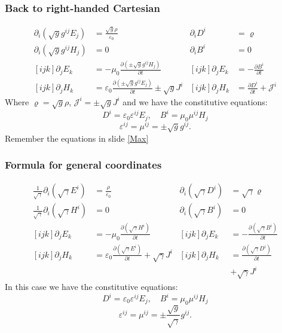 \documentclass{beamer}
\begin{document}
\begin{frame}
\frametitle{Back to  right-handed Cartesian}\label{MMax}
\begin{align*}
\partial_i\left(\sqrt{g}g^{ij}E_j\right) &= \frac{\sqrt{g}\rho}{\varepsilon_0}
&\partial_i D^i&=\varrho\\
\partial_i\left(\sqrt{g}g^{ij}H_j\right) &=0
&\partial_i B^i&=0\\
[ijk]\partial_jE_k &= -\mu_0\frac{\partial\left(\pm \sqrt{g}g^{ij}H_j\right)}{\partial t}
&[ijk]\partial_jE_k&=-\frac{\partial B^i}{\partial t}\\
[ijk]\partial_jH_k &= \varepsilon_0\frac{\partial \left(\pm \sqrt{g}g^{ij}E_j\right)}{\partial t} \pm \sqrt{g}J^i
 &[ijk]\partial_jH_k&=\frac{\partial D^i}{\partial t}+\mathcal{J}^i
\end{align*}
Where \(\varrho=\sqrt{g}\rho\), \(\mathcal{J}^i=\pm\sqrt{g}J^i\) and
we have the constitutive equations:
\[D^i=\varepsilon_0\varepsilon^{ij}E_j,\quad B^i=\mu_0\mu^{ij}H_j\]
\[\varepsilon^{ij}=\mu^{ij}=\pm\sqrt{g}g^{ij}.\]
Remember the equations in slide \ref{Max}
\end{frame}

\begin{frame}
\frametitle{Formula for general coordinates}
\begin{align*}
\frac{1}{\sqrt{\gamma}}\partial_i\left(\sqrt{\gamma}E^i\right) &= \frac{\rho}{\varepsilon_0}
&\partial_i\left(\sqrt{\gamma}D^i\right)&=\sqrt{\gamma}\varrho\\
\frac{1}{\sqrt{\gamma}}\partial_i\left(\sqrt{\gamma}H^i\right) &=0
&\partial_i\left(\sqrt{\gamma}B^i\right)&=0\\
[ijk] \partial_jE_k &= -\mu_0\frac{\partial \left(\sqrt{\gamma} H^i\right)}{\partial t}
&[ijk] \partial_jE_k &= -\frac{\partial \left(\sqrt{\gamma} B^i\right)}{\partial t}\\
[ijk] \partial_jH_k &= \varepsilon_0\frac{\partial \left(\sqrt{\gamma} E^i\right)}{\partial t} + \sqrt{\gamma}J^i
&[ijk] \partial_jH_k &= \frac{\partial \left(\sqrt{\gamma} D^i\right)}{\partial t}\\
&&&+ \sqrt{\gamma}J^i
\end{align*}
In this case we have the constitutive equations:
\[D^i=\varepsilon_0\varepsilon^{ij}E_j,\quad B^i=\mu_0\mu^{ij}H_j\]
\[\varepsilon^{ij}=\mu^{ij}=\pm\frac{\sqrt{g}}{\sqrt{\gamma}}g^{ij}.\]

\end{frame}
\end{document}
